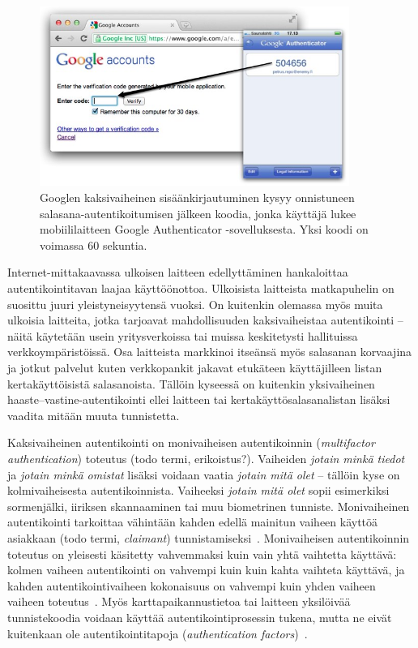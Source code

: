 \documentclass[finnish,gradu]{tktltiki}
\begin{document}
  \begin{figure}
    \centering
    \includegraphics[width=0.9\textwidth]{images/google_authenticator.jpg}
    \caption{Googlen kaksivaiheinen sisäänkirjautuminen kysyy onnistuneen salasana-autentikoitumisen jälkeen koodia, jonka käyttäjä lukee mobiililaitteen Google Authenticator -sovelluksesta. Yksi koodi on voimassa 60 sekuntia.}
    \label{fig:google_authenticator}
  \end{figure}

  Internet-mittakaavassa ulkoisen laitteen edellyttäminen hankaloittaa autentikointitavan laajaa käyttöönottoa. Ulkoisista laitteista matkapuhelin on suosittu juuri yleistyneisyytensä vuoksi. On kuitenkin olemassa myös muita ulkoisia laitteita, jotka tarjoavat mahdollisuuden kaksivaiheistaa autentikointi -- näitä käytetään usein yritysverkoissa tai muissa keskitetysti hallituissa verkkoympäristöissä. Osa laitteista markkinoi itseänsä myös salasanan korvaajina ja jotkut palvelut kuten verkkopankit jakavat etukäteen käyttäjilleen listan kertakäyttöisistä salasanoista. Tällöin kyseessä on kuitenkin yksivaiheinen haaste--vastine-autentikointi ellei laitteen tai kertakäyttösalasanalistan lisäksi vaadita mitään muuta tunnistetta.

  Kaksivaiheinen autentikointi on monivaiheisen autentikoinnin (\emph{multifactor authentication}) toteutus (todo termi, erikoistus?).
  Vaiheiden \emph{jotain minkä tiedot} ja \emph{jotain minkä omistat} lisäksi voidaan vaatia \emph{jotain mitä olet} -- tällöin kyse on kolmivaiheisesta autentikoinnista. Vaiheeksi \emph{jotain mitä olet} sopii esimerkiksi sormenjälki, iiriksen skannaaminen tai muu biometrinen tunniste. Monivaiheinen autentikointi tarkoittaa vähintään kahden edellä mainitun vaiheen käyttöä asiakkaan (todo termi, \emph{claimant}) tunnistamiseksi~\cite{NIST_SP800-63-1}. Monivaiheisen autentikoinnin toteutus on yleisesti käsitetty vahvemmaksi kuin vain yhtä vaihtetta käyttävä: kolmen vaiheen autentikointi on vahvempi kuin kuin kahta vaihteta käyttävä, ja kahden autentikointivaiheen kokonaisuus on vahvempi kuin yhden vaiheen vaiheen toteutus~\cite{NIST_SP800-63-1}. Myös karttapaikannustietoa tai laitteen yksilöivää tunnistekoodia voidaan käyttää autentikointiprosessin tukena, mutta ne eivät kuitenkaan ole autentikointitapoja (\emph{authentication factors})~\cite{NIST_SP800-63-1}.
\end{document}
